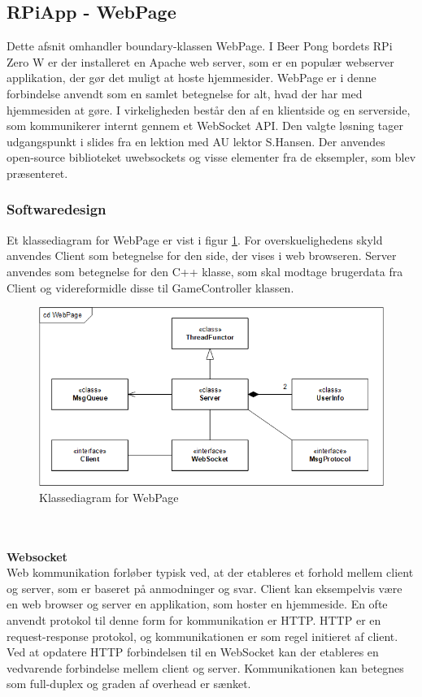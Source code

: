 \documentclass[Rapport/Rapport_main.tex]{subfiles}
\begin{document}
\subsection{RPiApp - WebPage}
Dette afsnit omhandler boundary-klassen WebPage. I Beer Pong bordets RPi Zero W er der installeret en Apache web server, som er en populær webserver applikation, der gør det muligt at hoste hjemmesider.\cite{apache_web_server} WebPage er i denne forbindelse anvendt som en samlet betegnelse for alt, hvad der har med hjemmesiden at gøre. I virkeligheden består den af en klientside og en serverside, som kommunikerer internt gennem et WebSocket API. Den valgte løsning tager udgangspunkt i slides\cite{websockets_getting_started} fra en lektion med AU lektor S.Hansen. Der anvendes open-source biblioteket uwebsockets\cite{uwebsockets_repo} og visse elementer fra de eksempler, som blev præsenteret.

\subsubsection{Softwaredesign}
Et klassediagram for WebPage er vist i figur \ref{fig:WebPage_class_diagram}. For overskuelighedens skyld anvendes Client som betegnelse for den side, der vises i web browseren. Server anvendes som betegnelse for den C++ klasse, som skal modtage brugerdata fra Client og videreformidle disse til GameController klassen.
\begin{figure}[H]
    \centering
    \includegraphics[width=1\textwidth]{Softwaredesign/RPiApp/graphic_RPi/cd_WebPage.png}
    \caption{Klassediagram for WebPage}
    \label{fig:WebPage_class_diagram}
\end{figure}

\\\\\textbf{Websocket}
\\Web kommunikation forløber typisk ved, at der etableres et forhold mellem client og server, som er baseret på anmodninger og svar. Client kan eksempelvis være en web browser og server en applikation, som hoster en hjemmeside. En ofte anvendt protokol til denne form for kommunikation er HTTP.\cite{http_wiki} HTTP er en request-response protokol, og kommunikationen er som regel initieret af client. Ved at opdatere HTTP forbindelsen til en WebSocket kan der etableres en vedvarende forbindelse mellem client og server. Kommunikationen kan betegnes som full-duplex og graden af overhead er sænket.\cite{websocket_wiki}
\end{document}

